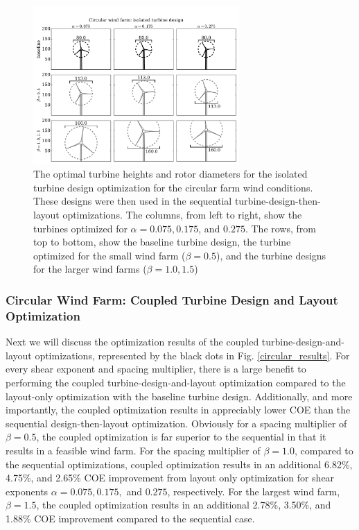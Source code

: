 \documentclass[wes, manuscript]{copernicus}
\begin{document}
\begin{figure}[htbp]
  \centering
  \includegraphics[trim={0.5cm 0.3cm 0.3cm 2.75cm},clip,width=0.7\textwidth]{Figures/turbineSizesCircular_sequential.pdf}
  \caption{\label{circular_turbines_seq} The optimal turbine heights and rotor diameters for the isolated turbine design optimization for the circular farm wind conditions. These designs were then used in the sequential turbine-design-then-layout optimizations. The columns, from left to right, show the turbines optimized for $\alpha=0.075,0.175$, and $0.275$. The rows, from top to bottom, show the baseline turbine design, the turbine optimized for the small wind farm ($\beta=0.5$), and the turbine designs for the larger wind farms ($\beta=1.0,1.5$)}
\end{figure}



\subsubsection{Circular Wind Farm: Coupled Turbine Design and Layout Optimization}
Next we will discuss the optimization results of the coupled turbine-design-and-layout optimizations, represented by the black dots in Fig. \ref{circular_results}. For every shear exponent and spacing multiplier, there is a large benefit to performing the coupled turbine-design-and-layout optimization compared to the layout-only optimization with the baseline turbine design. Additionally, and more importantly, the coupled optimization results in appreciably lower COE than the sequential design-then-layout optimization. Obviously for a spacing multiplier of $\beta=0.5$, the coupled optimization is far superior to the sequential in that it results in a feasible wind farm. For the spacing multiplier of $\beta=1.0$, 
compared to the sequential optimizations, coupled optimization results in an additional 6.82\%, 4.75\%, and 2.65\% COE improvement from layout only optimization for shear exponents $\alpha=0.075, 0.175,$ and $0.275$, respectively. For the largest wind farm, $\beta=1.5$, the coupled optimization results in an additional 2.78\%, 3.50\%, and 1.88\% COE improvement compared to the sequential case. 
\end{document}
